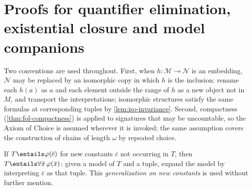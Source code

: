 \section{Proofs for quantifier elimination, existential closure and model companions}
\label{sec:annex-p03-w03-p03-020-qe}

Two conventions are used throughout. First, when \(h:\mathcal M\to\mathcal N\)
is an embedding, \(\mathcal N\) may be replaced by an isomorphic copy in
which \(h\) is the inclusion: rename each \(h(a)\) as \(a\) and each element
outside the range of \(h\) as a new object not in \(M\), and transport the
interpretations; isomorphic structures satisfy the same formulas at
corresponding tuples by \cref{lem:iso-invariance}. Second, compactness
(\cref{thm:fol-compactness}) is applied to signatures that may be
uncountable, so the Axiom of Choice is assumed wherever it is invoked; the
same assumption covers the construction of chains of length \(\omega\) by
repeated choice.

If \(T\entails\varphi(\bar c)\) for new constants \(\bar c\) not occurring
in \(T\), then \(T\entails\forall\bar x\,\varphi(\bar x)\): given a model of
\(T\) and a tuple, expand the model by interpreting \(\bar c\) as that
tuple. This \emph{generalization on new constants} is used without further
mention.

